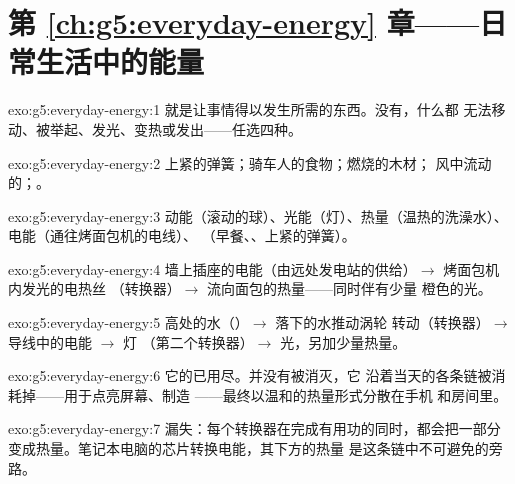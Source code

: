 \section*{第 \ref{ch:g5:everyday-energy} 章——日常生活中的能量}

\begin{solution}{exo:g5:everyday-energy:1}
就是让事情得以发生所需的东西。没有，什么都
无法移动、被举起、发光、变热或发出——任选四种。
\end{solution}

\begin{solution}{exo:g5:everyday-energy:2}
上紧的弹簧；骑车人的食物；燃烧的木材；
风中流动的；。
\end{solution}

\begin{solution}{exo:g5:everyday-energy:3}
动能（滚动的球）、光能（灯）、热量（温热的洗澡水）、
电能（通往烤面包机的电线）、
（早餐、、上紧的弹簧）。
\end{solution}

\begin{solution}{exo:g5:everyday-energy:4}
墙上插座的电能（由远处发电站的供给）$\to$
烤面包机内发光的电热丝
（转换器）$\to$ 流向面包的热量——同时伴有少量
橙色的光。
\end{solution}

\begin{solution}{exo:g5:everyday-energy:5}
高处的水（）$\to$ 落下的水推动涡轮
转动（转换器）$\to$ 导线中的电能 $\to$ 灯
（第二个转换器）$\to$ 光，另加少量热量。
\end{solution}

\begin{solution}{exo:g5:everyday-energy:6}
它的已用尽。并没有被消灭，它
沿着当天的各条链被消耗掉——用于点亮屏幕、制造
——最终以温和的热量形式分散在手机
和房间里。
\end{solution}

\begin{solution}{exo:g5:everyday-energy:7}
漏失：每个转换器在完成有用功的同时，都会把一部分
变成热量。笔记本电脑的芯片转换电能，其下方的热量
是这条链中不可避免的旁路。
\end{solution}

